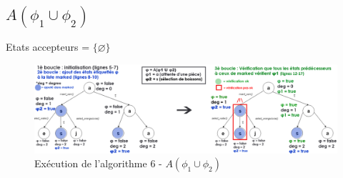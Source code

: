 \documentclass[runningheads,a4paper,10pt]{llncs}
\begin{document}
\begin{subappendices}
\subsection{$A(\phi_{1} \cup \phi_{2})$} 

\noindent
Etats accepteurs = $\{ \varnothing\}$ \\

\begin{figure}
  \centering
   \includegraphics[scale=0.3]{figures/algo-AU.png}
   \caption[Caption for LOF]{Exécution de l'algorithme 6 - $A(\phi_{1} \cup \phi_{2})$}
   \label{fig:algo-AU}
\end{figure} 

\end{subappendices}


\nocite{*}

\end{document}
